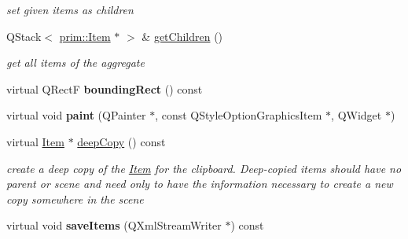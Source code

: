 \begin{DoxyCompactItemize}
\begin{DoxyCompactList}\small\item\em set given items as children \end{DoxyCompactList}\item 
Q\+Stack$<$ \hyperlink{classprim_1_1Item}{prim\+::\+Item} $\ast$ $>$ \& \hyperlink{classprim_1_1Aggregate_a348764875e84d9fb4bf169695fe9a3b9}{get\+Children} ()\hypertarget{classprim_1_1Aggregate_a348764875e84d9fb4bf169695fe9a3b9}{}\label{classprim_1_1Aggregate_a348764875e84d9fb4bf169695fe9a3b9}

\begin{DoxyCompactList}\small\item\em get all items of the aggregate \end{DoxyCompactList}\item 
virtual Q\+RectF {\bfseries bounding\+Rect} () const \hypertarget{classprim_1_1Aggregate_a9b6dce451ef2a216ac6f67376d9597a4}{}\label{classprim_1_1Aggregate_a9b6dce451ef2a216ac6f67376d9597a4}

\item 
virtual void {\bfseries paint} (Q\+Painter $\ast$, const Q\+Style\+Option\+Graphics\+Item $\ast$, Q\+Widget $\ast$)\hypertarget{classprim_1_1Aggregate_aa264a39370d3b610fca2d2b80e359a4c}{}\label{classprim_1_1Aggregate_aa264a39370d3b610fca2d2b80e359a4c}

\item 
virtual \hyperlink{classprim_1_1Item}{Item} $\ast$ \hyperlink{classprim_1_1Aggregate_ae2d55ee6f06e4aaea57bf52800a80c7a}{deep\+Copy} () const \hypertarget{classprim_1_1Aggregate_ae2d55ee6f06e4aaea57bf52800a80c7a}{}\label{classprim_1_1Aggregate_ae2d55ee6f06e4aaea57bf52800a80c7a}

\begin{DoxyCompactList}\small\item\em create a deep copy of the \hyperlink{classprim_1_1Item}{Item} for the clipboard. Deep-\/copied items should have no parent or scene and need only to have the information necessary to create a new copy somewhere in the scene \end{DoxyCompactList}\item 
virtual void {\bfseries save\+Items} (Q\+Xml\+Stream\+Writer $\ast$) const \hypertarget{classprim_1_1Aggregate_a9432adbbaa40fda61ed37b53d6237c4c}{}\label{classprim_1_1Aggregate_a9432adbbaa40fda61ed37b53d6237c4c}

\end{DoxyCompactItemize}
